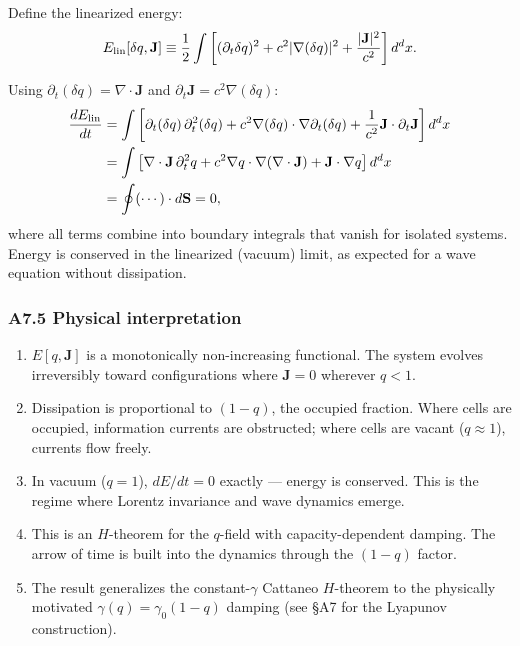 \documentclass[reprint]{revtex4-2}
\begin{document}
Define the linearized energy:
\begin{equation}
E_{\rm lin}[\delta q, \mathbf{J}] \equiv \frac{1}{2}\int \left[(\partial_t\delta q)^2 + c^2|\nabla(\delta q)|^2 + \frac{|\mathbf{J}|^2}{c^2}\right] d^d x.
\end{equation}

Using $\partial_t(\delta q) = \nabla\cdot\mathbf{J}$ and $\partial_t\mathbf{J} = c^2\nabla(\delta q)$:
\begin{align}
\frac{dE_{\rm lin}}{dt} &= \int \left[\partial_t(\delta q)\,\partial_t^2(\delta q) + c^2\nabla(\delta q)\cdot\nabla\partial_t(\delta q) + \frac{1}{c^2}\mathbf{J}\cdot\partial_t\mathbf{J}\right] d^d x \nonumber \\
&= \int \left[\nabla\cdot\mathbf{J}\,\partial_t^2 q + c^2\nabla q\cdot\nabla(\nabla\cdot\mathbf{J}) + \mathbf{J}\cdot\nabla q\right] d^d x \nonumber \\
&= \oint (\cdots)\cdot d\mathbf{S} = 0,
\end{align}
where all terms combine into boundary integrals that vanish for isolated systems. Energy is conserved in the linearized (vacuum) limit, as expected for a wave equation without dissipation.

\subsubsection{A7.5 Physical interpretation}

\begin{enumerate}[label=(\roman*)]
\item $E[q,\mathbf{J}]$ is a monotonically non-increasing functional. The system evolves irreversibly toward configurations where $\mathbf{J}=0$ wherever $q<1$.
\item Dissipation is proportional to $(1-q)$, the occupied fraction. Where cells are occupied, information currents are obstructed; where cells are vacant ($q\approx 1$), currents flow freely.
\item In vacuum ($q=1$), $dE/dt = 0$ exactly --- energy is conserved. This is the regime where Lorentz invariance and wave dynamics emerge.
\item This is an $H$-theorem for the $q$-field with capacity-dependent damping. The arrow of time is built into the dynamics through the $(1-q)$ factor.
\item The result generalizes the constant-$\gamma$ Cattaneo $H$-theorem to the physically motivated $\gamma(q)=\gamma_0(1-q)$ damping (see \S A7 for the Lyapunov construction).
\end{enumerate}
\end{document}
